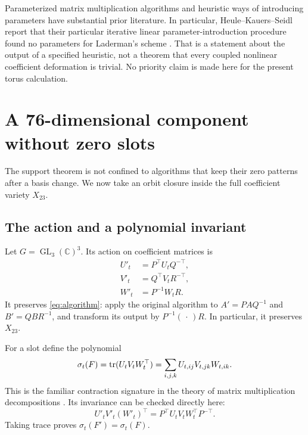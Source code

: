 \documentclass[11pt,letterpaper]{article}
\theoremstyle{definition}\newtheorem{definition}[theorem]{Definition}
\theoremstyle{remark}\newtheorem{remark}[theorem]{Remark}
\newcommand{\CC}{\mathbb C}\newcommand{\ZZ}{\mathbb Z}\newcommand{\QQ}{\mathbb Q}
\DeclareMathOperator{\GL}{GL}\DeclareMathOperator{\diag}{diag}
\begin{document}
Parameterized matrix multiplication algorithms and heuristic ways of
introducing parameters have substantial prior literature. In particular,
Heule--Kauers--Seidl report that their particular iterative linear
parameter-introduction procedure found no parameters for Laderman's
scheme \cite[Section 7]{hks}. That is a statement about the output of a
specified heuristic, not a theorem that every coupled nonlinear
coefficient deformation is trivial. No priority claim is made here for
the present torus calculation.

\section{A 76-dimensional component without zero slots}
\label{sec:component}
The support theorem is not confined to algorithms that keep their zero
patterns after a basis change. We now take an orbit closure inside the
full coefficient variety $X_{23}$.

\subsection{The action and a polynomial invariant}
Let $G=\GL_3(\CC)^3$. Its action on coefficient matrices is
\begin{equation}\label{eq:action}
\begin{split}
 U'_t&=P^\top U_tQ^{-\top},\\
 V'_t&=Q^\top V_tR^{-\top},\\
 W'_t&=P^{-1}W_tR.
\end{split}
\end{equation}
It preserves \eqref{eq:algorithm}: apply the original algorithm to
$A'=PAQ^{-1}$ and $B'=QBR^{-1}$, and transform its output by
$P^{-1}(\,\cdot\,)R$. In particular, it preserves $X_{23}$.

For a slot define the polynomial
\begin{equation}\label{eq:sig}
 \sigma_t(F)=\operatorname{tr}(U_tV_tW_t^\top)
 =\sum_{i,j,k}U_{t,ij}V_{t,jk}W_{t,ik}.
\end{equation}
This is the familiar contraction signature in the theory of matrix
multiplication decompositions \cite{tichavsky}. Its invariance can be
checked directly here:
\[
 U'_tV'_t(W'_t)^\top
   =P^\top U_tV_tW_t^\top P^{-\top}.
\]
Taking trace proves $\sigma_t(F')=\sigma_t(F)$.
\end{document}
